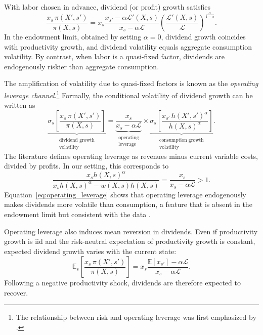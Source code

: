 With labor chosen in advance, dividend (or profit) growth satisfies
\begin{equation}\label{eq: dividend_growth}
\frac{x_s\,\pi(X',s')}{\pi(X,s)}
=
x_s
\frac{x_{s'}-\alpha\mathcal L'(X,s)}{x_s-\alpha\mathcal L}
\left(
\frac{\mathcal L'(X,s)}{\mathcal L}
\right)^{\frac{\alpha}{1-\alpha}}.
\end{equation}
In the endowment limit, obtained by setting $\alpha=0$, dividend growth coincides with
productivity growth, and dividend volatility equals aggregate consumption volatility. By
contrast, when labor is a quasi-fixed factor, dividends are endogenously riskier than
aggregate consumption.

The amplification of volatility due to quasi-fixed factors is known as the
\emph{operating leverage channel}.\footnote{The relationship between risk and operating
leverage was first emphasized by \citet{lev1974association}.} Formally, the conditional
volatility of dividend growth can be written as
\begin{equation}\label{eq:operating_leverage}
\underbrace{
\sigma_s\!\left[
\frac{x_s\,\pi(X',s')}{\pi(X,s)}
\right]
}_{\substack{\text{dividend growth}\\\text{volatility}}}
=
\underbrace{
\frac{x_s}{x_s-\alpha\mathcal L}
}_{\substack{\text{operating}\\\text{leverage}}}
\times
\underbrace{
\sigma_s\!\left[
\frac{x_{s'}\,h(X',s')^\alpha}{h(X,s)^\alpha}
\right]
}_{\substack{\text{consumption growth}\\\text{volatility}}}.
\end{equation}
The literature defines operating leverage as revenues minus current variable costs,
divided by profits. In our setting, this corresponds to
\[
\frac{x_s h(X,s)^\alpha}{x_s h(X,s)^\alpha - w(X,s)h(X,s)}
=
\frac{x_s}{x_s-\alpha\mathcal L}
>
1.
\]
Equation~\eqref{eq:operating_leverage} shows that operating leverage endogenously makes
dividends more volatile than consumption, a feature that is absent in the endowment limit
but consistent with the data \citep[e.g.,][]{campbell2003consumption}.

Operating leverage also induces mean reversion in dividends. Even if productivity growth
is iid and the risk-neutral expectation of productivity growth is constant, expected
dividend growth varies with the current state:
\begin{equation}\label{eq:meanreversion}
\mathbb E_s\!\left[
\frac{x_s\,\pi(X',s')}{\pi(X,s)}
\right]
=
x_s
\frac{\mathbb E[x_{s'}]-\alpha\mathcal L}{x_s-\alpha\mathcal L}.
\end{equation}
Following a negative productivity shock, dividends are therefore expected to
recover.

